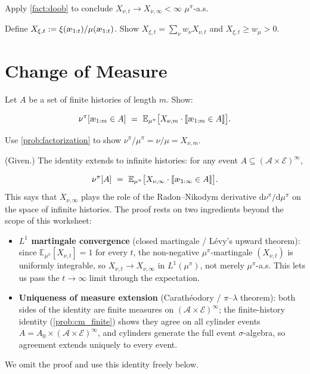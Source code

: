 \documentclass[fontsize=11pt, parskip=half]{scrartcl}
\newcommand{\llbracket}{\mathopen{[\![}}
\newcommand{\rrbracket}{\mathclose{]\!]}}
\newcommand{\cA}{\mathcal{A}}
\newcommand{\cE}{\mathcal{E}}
\newcommand{\Ex}{\mathbb{E}}
\newcommand{\aes}{\textnormal{\ae}}
\begin{document}
\begin{exercise}
\label{prob:X_converges}
Apply \cref{fact:doob} to conclude $X_{\nu,t} \to X_{\nu,\infty} < \infty$ $\mu^\pi$-a.s.

\end{exercise}


\begin{exercise}
\label{prob:X_bounded_mu}
Define $X_{\xi,t} := \xi(\aes_{1:t})/\mu(\aes_{1:t})$. 
Show $X_{\xi,t} = \sum_\nu w_\nu X_{\nu,t}$ and $X_{\xi,t} \geq w_\mu > 0$.

\end{exercise}



\section{Change of Measure}\label{prob:change_measure}

\begin{exercise}
\label{prob:cm_finite}
Let $A$ be a set of finite histories of length $m$. Show:

\[
    \nu^\pi[\aes_{1:m} \in A] ~=~ \Ex_{\mu^\pi}\big[X_{\nu,m} \cdot \llbracket \aes_{1:m} \in A \rrbracket\big].
\]
\begin{hint}
Use \cref{prob:factorization} to show $\nu^\pi/\mu^\pi = \nu/\mu = X_{\nu,m}$.
\end{hint}
\end{exercise}


\begin{exercise}
\label{prob:cm_extension}
\textup{(Given.)} The identity extends to infinite histories: for any event $A \subseteq (\cA \times \cE)^\infty$,

\[
    \nu^\pi[A] ~=~ \Ex_{\mu^\pi}\big[X_{\nu,\infty} \cdot \llbracket \aes_{1:\infty} \in A \rrbracket\big].
\]
This says that $X_{\nu,\infty}$ plays the role of the Radon--Nikodym derivative $\mathrm{d}\nu^\pi/\mathrm{d}\mu^\pi$ on the space of infinite histories. The proof rests on two ingredients beyond the scope of this worksheet:
\begin{itemize}
    \item \textbf{$L^1$ martingale convergence} (closed martingale / L\'evy's upward theorem): since $\Ex_{\mu^\pi}[X_{\nu,t}] = 1$ for every $t$, the non-negative $\mu^\pi$-martingale $(X_{\nu,t})$ is uniformly integrable, so $X_{\nu,t} \to X_{\nu,\infty}$ in $L^1(\mu^\pi)$, not merely $\mu^\pi$-a.s. This lets us pass the $t\to\infty$ limit through the expectation.
    \item \textbf{Uniqueness of measure extension} (Carath\'eodory / $\pi$--$\lambda$ theorem): both sides of the identity are finite measures on $(\cA\times\cE)^\infty$; the finite-history identity (\cref{prob:cm_finite}) shows they agree on all cylinder events $A = A_0 \times (\cA\times\cE)^\infty$, and cylinders generate the full event $\sigma$-algebra, so agreement extends uniquely to every event.
\end{itemize}
We omit the proof and use this identity freely below.
\end{exercise}
\end{document}
